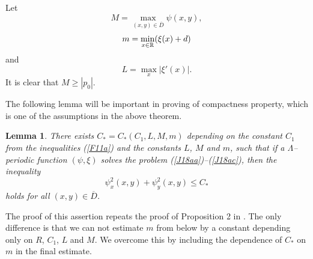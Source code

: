 \documentclass[a4paper,reqno,12pt]{amsart}
\theoremstyle{plain}
\newtheorem{lemma}[theorem]{Lemma}
\theoremstyle{definition}
\numberwithin{equation}{section}
\begin{document}
Let
\begin{equation}\label{A29a}
M=\max_{(x,y)\in \overline{D}}\psi(x,y),
\end{equation}
\begin{equation}\label{Ma27a}
m=\min_{x\in \Bbb R}(\xi(x)+d)
\end{equation}
and
\begin{equation}\label{A29aa}
L=\max_x|\xi'(x)|.
\end{equation}
It is clear that $M\geq |p_0|$.

The following lemma will be important in proving of compactness property, which is one of the  assumptions in the above theorem.
\begin{lemma}\label{LA29a}
There exists $C_*=C_*(C_1,L,M,m)$ depending on the constant $C_1$ from the inequalities (\ref{F11a})   and the constants $L$, $M$ and $m$, such that if a $\Lambda$-- periodic function $(\psi,\xi)$ solves the problem (\ref{J18aa})--(\ref{J18ac}), then the inequality
\begin{equation}\label{Ma27aa}
\psi_x^2(x,y)+\psi_y^2(x,y)\leq C_*
\end{equation}
 holds for all $(x,y)\in \overline{D}$.
\end{lemma}
The proof of this assertion repeats the proof of Proposition 2 in \cite{KLN17}. The only difference is that
we can not estimate $m$ from below by a constant depending only on $R$, $C_1$, $L$ and $M$. We overcome this by including the dependence of $C_*$ on $m$ in the final estimate.
\end{document}
